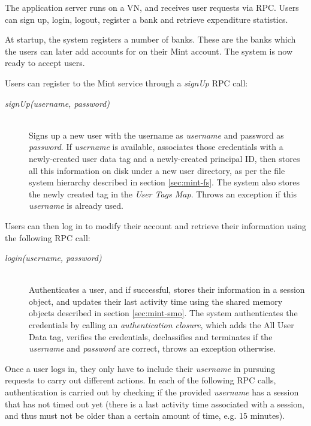 The application server runs on a VN, and receives user requests via RPC. Users can sign up, login, logout, register a bank and retrieve expenditure statistics.

At startup, the system registers a number of banks. These are the banks which the users can later add accounts for on their Mint account. The system is now ready to accept users.

Users can register to the Mint service through a \emph{signUp} RPC call:

\begin{description}
  \item[\emph{signUp(username, password)}] \ \\
    Signs up a new user with the username as 
    \emph{username} and password as \emph{password}. 
    If \emph{username} is available, associates 
    those credentials with a newly-created user data 
    tag and a newly-created principal ID,
    then stores all this information on disk under
    a new user directory, as per the file system
    hierarchy described in section 
    \ref{sec:mint-fs}. The system
    also stores the newly created tag in the 
    \emph{User Tags Map}.
    Throws an exception if this \emph{username}
    is already used.
\end{description}

Users can then log in to modify their account and retrieve their information using the following RPC call:

\begin{description}
  \item[\emph{login(username, password)}] \ \\
    Authenticates a user, and if successful, 
    stores their information in a session 
    object, and updates their last activity
    time using the shared memory objects
    described in section \ref{sec:mint-smo}.
    The system authenticates the 
    credentials by calling an 
    \emph{authentication closure}, which 
    adds the All User Data tag, 
    verifies the credentials, declassifies 
    and terminates if the \emph{username} and
    \emph{password} are correct, throws 
    an exception otherwise.
\end{description}

Once a user logs in, they only have to include their \emph{username} in pursuing requests to carry out different actions. In each of the following RPC calls, authentication is carried out by checking if the provided \emph{username} has a session that has not timed out yet (there is a last activity time associated with a session, and thus must not be older than a certain amount of time, e.g. 15 minutes).


